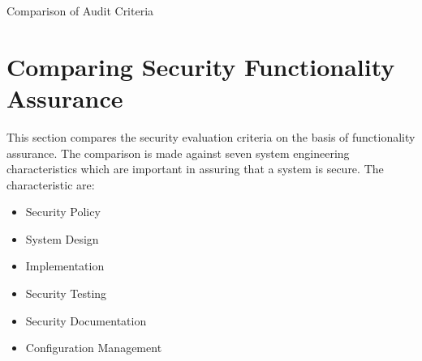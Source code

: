     \begin{table}[H]
    \begin{center}
    \bc
    \ec
    \end{center}
    \caption{Comparison of Audit Criteria} \label{table:audit}
    \end{table}


\section{Comparing Security Functionality Assurance} 
    This section compares the security evaluation criteria on the basis
    of functionality assurance. The comparison is made against seven
    system engineering characteristics which are important in
    assuring that a system is secure. The characteristic are:
    \begin{itemize}
        \item Security Policy
        \item System Design
        \item Implementation
        \item Security Testing
        \item Security Documentation
        \item Configuration Management
    \end{itemize}

